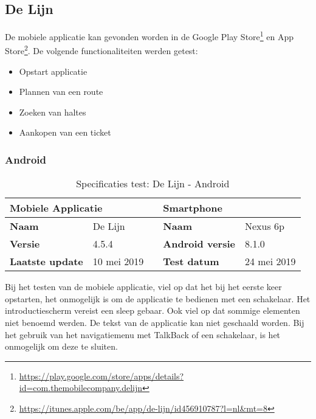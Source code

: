 \subsection{De Lijn}
De mobiele applicatie kan gevonden worden in de Google Play Store\footnote{\url{https://play.google.com/store/apps/details?id=com.themobilecompany.delijn}} en App Store\footnote{\url{https://itunes.apple.com/be/app/de-lijn/id456910787?l=nl&mt=8}}. De volgende functionaliteiten werden getest: \begin{itemize}
    \item Opstart applicatie
    \item Plannen van een route
    \item Zoeken van haltes
    \item Aankopen van een ticket
\end{itemize}

\subsubsection{Android}
\begin{table} [H]
    \centering
    \caption{Specificaties test: De Lijn - Android}
    \begin{tabular}{|l|l|l|l|l|} 
        \hline
        \multicolumn{2}{|l|}{\textbf{Mobiele Applicatie } } &  & \multicolumn{2}{l|}{\textbf{Smartphone }}  \\ 
        \hline
        \textbf{Naam}           & De Lijn                   &  & \textbf{Naam}           & Nexus 6p         \\ 
        \hline
        \textbf{Versie}         & 4.5.4                     &  & \textbf{Android versie} & 8.1.0            \\ 
        \hline
        \textbf{Laatste update} & 10 mei 2019               &  & \textbf{Test datum}     & 24 mei 2019      \\
        \hline
    \end{tabular}
\end{table}



Bij het testen van de mobiele applicatie, viel op dat het bij het eerste keer opstarten, het onmogelijk is om de applicatie te bedienen met een schakelaar. Het introductiescherm vereist een sleep gebaar. Ook viel op dat sommige elementen niet benoemd werden. De tekst van de applicatie kan niet geschaald worden. Bij het gebruik van het navigatiemenu met TalkBack of een schakelaar, is het onmogelijk om deze te sluiten.

